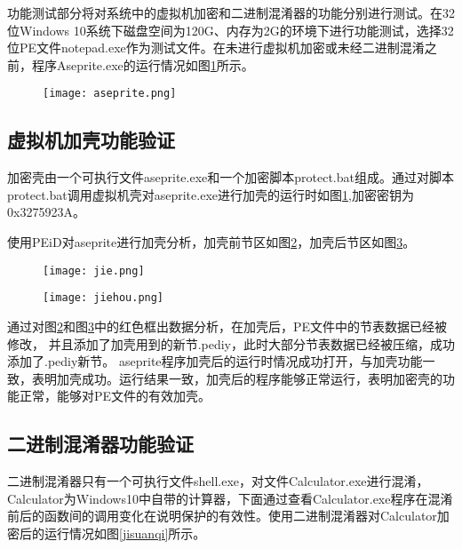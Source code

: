 功能测试部分将对系统中的虚拟机加密和二进制混淆器的功能分别进行测试。在32位Windows 10系统下磁盘空间为120G、内存为2G的环境下进行功能测试，选择32位PE文件notepad.exe作为测试文件。在未进行虚拟机加密或未经二进制混淆之前，程序Aseprite.exe的运行情况如图\ref{aseprite}所示。

\begin{figure}[htbp]
	\centering
	\texttt{[image: aseprite.png]}
	\label{aseprite}
\end{figure}

\subsection{虚拟机加壳功能验证}

加密壳由一个可执行文件aseprite.exe和一个加密脚本protect.bat组成。通过对脚本protect.bat调用虚拟机壳对aseprite.exe进行加壳的运行时如图\ref{aseprite},加密密钥为0x3275923A。



使用PEiD对aseprite进行加壳分析，加壳前节区如图\ref{jie}，加壳后节区如图\ref{jiehou}。

\begin{figure}[htbp]
	\centering
	\texttt{[image: jie.png]}
	\label{jie}
\end{figure}
\begin{figure}[htbp]
	\centering
	\texttt{[image: jiehou.png]}
	\label{jiehou}
\end{figure}


通过对图\ref{jie}和图\ref{jiehou}中的红色框出数据分析，在加壳后，PE文件中的节表数据已经被修改， 并且添加了加壳用到的新节.pediy，此时大部分节表数据已经被压缩，成功添加了.pediy新节。
aseprite程序加壳后的运行时情况成功打开，与加壳功能一致，表明加壳成功。运行结果一致，加壳后的程序能够正常运行，表明加密壳的功能正常，能够对PE文件的有效加壳。


\subsection{二进制混淆器功能验证}

二进制混淆器只有一个可执行文件shell.exe，对文件Calculator.exe进行混淆，Calculator为Windows10中自带的计算器，下面通过查看Calculator.exe程序在混淆前后的函数间的调用变化在说明保护的有效性。使用二进制混淆器对Calculator加密后的运行情况如图\ref{jisuanqi}所示。

